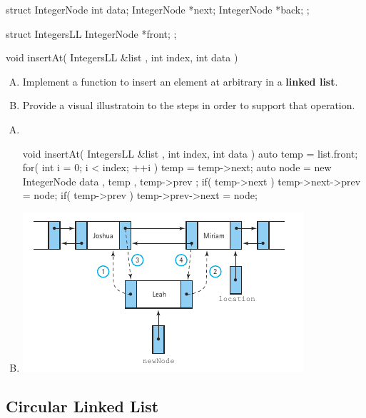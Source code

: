 \documentclass[usenames,dvipsnames]{article}
\begin{document}
\cprotEnv \begin{question}
\begin{cppcode}
struct IntegerNode
{
  int data;
  IntegerNode *next;
  IntegerNode *back;
};

struct IntegersLL
{
  IntegerNode *front;
};

void insertAt( IntegersLL &list , int index, int data )
{
  
}
\end{cppcode}
\begin{enumerate}[A)]
\item Implement a function  to insert an element at arbitrary  in a \textbf{linked list}.
\item Provide a visual illustratoin to the steps in order to support that operation.
\end{enumerate}
\end{question}
\cprotEnv \begin{solution}

\begin{enumerate}[A)]
\item  \mbox{}\\
\begin{cppcode}
void insertAt( IntegersLL &list , int index, int data )
{
  auto temp = list.front;
  for( int i = 0; i < index; ++i ) temp = temp->next;
  auto node = new IntegerNode{ data , temp , temp->prev };
  if( temp->next ) temp->next->prev = node;
  if( temp->prev ) temp->prev->next = node;
}
\end{cppcode}

\item 

\includegraphics{imgs/insertAt.png}


\end{enumerate}

\end{solution}


\subsection{Circular Linked List}
\end{document}

